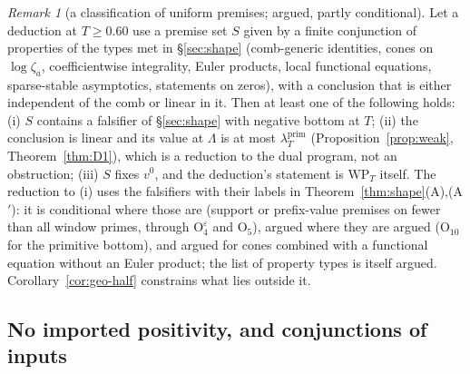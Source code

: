 \documentclass[11pt]{amsart}
\theoremstyle{definition}
\theoremstyle{remark}
\newtheorem{remark}[theorem]{Remark}
\newcommand{\lamP}{\lambda^{\mathrm{prim}}_T}
\begin{document}
\begin{remark}[a classification of uniform premises; argued, partly conditional]\label{rem:geo-trich}
Let a deduction at $T\ge0.60$ use a premise set $S$ given by a finite conjunction of properties of the types met in
\S\ref{sec:shape} (comb-generic identities, cones on $\log\zeta_a$, coefficientwise integrality, Euler products, local functional
equations, sparse-stable asymptotics, statements on zeros), with a conclusion that is either independent of the comb or linear in it.
Then at least one of the following holds: (i) $S$ contains a falsifier of \S\ref{sec:shape} with negative bottom at $T$; (ii) the
conclusion is linear and its value at $\Lambda$ is at most $\lamP$ (Proposition~\ref{prop:weak}, Theorem~\ref{thm:D1}), which is a
reduction to the dual program, not an obstruction; (iii) $S$ fixes $v^0$, and the deduction's statement is $\mathrm{WP}_T$ itself. The
reduction to (i) uses the falsifiers with their labels in Theorem~\ref{thm:shape}(A),(A$'$): it is conditional where those are
(support or prefix-value premises on fewer than all window primes, through $\mathrm O_4^\varepsilon$ and $\mathrm O_5$), argued where
they are argued ($\mathrm O_{10}$ for the primitive bottom), and argued for cones combined with a functional equation
without an Euler product; the list of property types is itself argued. Corollary~\ref{cor:geo-half} constrains what lies outside it.
\end{remark}

\subsection{No imported positivity, and conjunctions of inputs}\label{subsec:shape-noimport}
\end{document}
